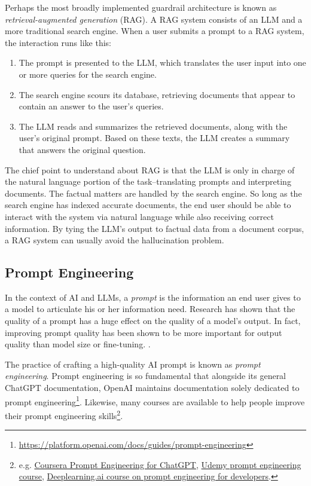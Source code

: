 \documentclass[12pt, oneside]{article}   	%
\begin{document}
Perhaps the most broadly implemented guardrail architecture is known as \emph{retrieval-augmented generation} (RAG).  A RAG system consists of an LLM and a more traditional search engine.  When a user submits a prompt to a RAG system, the interaction runs like this:
\begin{enumerate}
\item The prompt is presented to the LLM, which translates the user input into one or more queries for the search engine.
\item The search engine scours its database, retrieving documents that appear to contain an answer to the user's queries.
\item The LLM reads and summarizes the retrieved documents, along with the user's original prompt.  Based on these texts, the LLM creates a summary that answers the original question.
\end{enumerate}
The chief point to understand about RAG is that the LLM is only in charge of the natural language portion of the task--translating prompts and interpreting documents.  The factual matters are handled by the search engine.  So long as the search engine has indexed accurate documents, the end user should be able to interact with the system via natural language while also receiving correct information.  By tying the LLM's output to factual data from a document corpus, a RAG system can usually avoid the hallucination problem.




\subsection{Prompt Engineering}\label{section.vocab.prompt-engineering}
In the context of AI and LLMs, a \emph{prompt} is the information an end user gives to a model to articulate his or her information need.  Research has shown that the quality of a prompt has a huge effect on the quality of a model's output.  In fact, improving prompt quality has been shown to be more important for output quality than model size or fine-tuning. \cite{white:2023}.  

The practice of crafting a high-quality AI prompt is known as \emph{prompt engineering}.  Prompt engineering is so fundamental that alongside its general ChatGPT documentation, OpenAI maintains documentation solely dedicated to prompt engineering\footnote{\href{https://platform.openai.com/docs/guides/prompt-engineering}{https://platform.openai.com/docs/guides/prompt-engineering}}.  Likewise, many courses are available to help people improve their prompt engineering skills\footnote{e.g. \href{https://www.coursera.org/learn/prompt-engineering}{Coursera Prompt Engineering for ChatGPT}, \href{https://www.udemy.com/course/prompt-engineering-for-ai}{Udemy prompt engineering course}, \href{https://www.deeplearning.ai/short-courses/chatgpt-prompt-engineering-for-developers/}{Deeplearning.ai course on prompt engineering for developers}. }.
\end{document}
